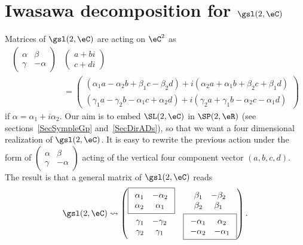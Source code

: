 \section{Iwasawa decomposition for \texorpdfstring{$\gsl(2,\eC)$}{sl2C}}		\label{SecIwasldeuxC}

Matrices of $\gsl(2,\eC)$ are acting on $\eC^2$ as
\[
	\begin{split}
		\begin{pmatrix}
			\alpha & \beta \\\gamma&-\alpha
		\end{pmatrix}&
		\begin{pmatrix}
			a+bi \\c+di
		\end{pmatrix}\\
		&=
		\begin{pmatrix}
			(\alpha_1a-\alpha_2b+\beta_1c-\beta_2d)+i(\alpha_2a+\alpha_1b+\beta_2c+\beta_1d) \\
			(\gamma_1a-\gamma_2b-\alpha_1c+\alpha_2d)+i(\gamma_2a+\gamma_1b-\alpha_2c-\alpha_1d)
		\end{pmatrix}
	\end{split}
\]
if $\alpha=\alpha_1+i\alpha_2$.  Our aim is to embed $\SL(2,\eC)$ in $\SP(2,\eR)$ (see sections~\ref{SecSympleGp} and~\ref{SecDirADs}), so that we want a four dimensional realization of $\gsl(2,\eC)$. It is easy to rewrite the previous action under the form of $\begin{pmatrix}
		\alpha & \beta \\\gamma&-\alpha
	\end{pmatrix}$ acting of the vertical four component vector $(a,b,c,d)$. The result is that a general matrix of $\gsl(2,\eC)$ reads
\begin{equation}		\label{EqGenslMatr}
	\gsl(2,\eC)\leadsto
	\begin{pmatrix}
		\boxed{
			\begin{array}{cc}
				\alpha_1 & -\alpha_2 \\
				\alpha_2 & \alpha_1
			\end{array}
		}                       &
		\begin{array}{cc}
			\beta_1 & -\beta_2 \\
			\beta_2 & \beta_1
		\end{array}        \\
		\begin{array}{cc}
			\gamma_1 & -\gamma_2 \\
			\gamma_2 & \gamma_1
		\end{array} &
		\boxed{
			\begin{array}{cc}
				-\alpha_1 & \alpha_2  \\
				-\alpha_2 & -\alpha_1
			\end{array}
		}
	\end{pmatrix}.
\end{equation}
